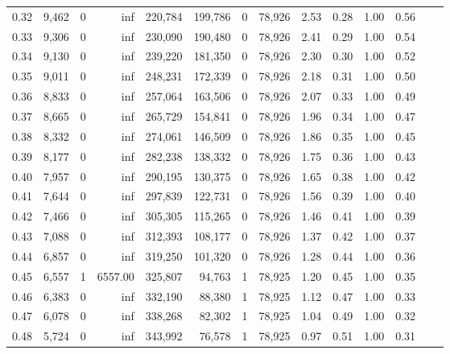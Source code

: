 \begin{tabular}{rrrrrrrrrrrrrr}
0.32 &  9,462 &      0 &      inf &  220,784 &  199,786 &       0 &  78,926 &  2.53 &  0.28 &  1.00 &      0.56 \\
0.33 &  9,306 &      0 &      inf &  230,090 &  190,480 &       0 &  78,926 &  2.41 &  0.29 &  1.00 &      0.54 \\
0.34 &  9,130 &      0 &      inf &  239,220 &  181,350 &       0 &  78,926 &  2.30 &  0.30 &  1.00 &      0.52 \\
0.35 &  9,011 &      0 &      inf &  248,231 &  172,339 &       0 &  78,926 &  2.18 &  0.31 &  1.00 &      0.50 \\
0.36 &  8,833 &      0 &      inf &  257,064 &  163,506 &       0 &  78,926 &  2.07 &  0.33 &  1.00 &      0.49 \\
0.37 &  8,665 &      0 &      inf &  265,729 &  154,841 &       0 &  78,926 &  1.96 &  0.34 &  1.00 &      0.47 \\
0.38 &  8,332 &      0 &      inf &  274,061 &  146,509 &       0 &  78,926 &  1.86 &  0.35 &  1.00 &      0.45 \\
0.39 &  8,177 &      0 &      inf &  282,238 &  138,332 &       0 &  78,926 &  1.75 &  0.36 &  1.00 &      0.43 \\
0.40 &  7,957 &      0 &      inf &  290,195 &  130,375 &       0 &  78,926 &  1.65 &  0.38 &  1.00 &      0.42 \\
0.41 &  7,644 &      0 &      inf &  297,839 &  122,731 &       0 &  78,926 &  1.56 &  0.39 &  1.00 &      0.40 \\
0.42 &  7,466 &      0 &      inf &  305,305 &  115,265 &       0 &  78,926 &  1.46 &  0.41 &  1.00 &      0.39 \\
0.43 &  7,088 &      0 &      inf &  312,393 &  108,177 &       0 &  78,926 &  1.37 &  0.42 &  1.00 &      0.37 \\
0.44 &  6,857 &      0 &      inf &  319,250 &  101,320 &       0 &  78,926 &  1.28 &  0.44 &  1.00 &      0.36 \\
0.45 &  6,557 &      1 &  6557.00 &  325,807 &   94,763 &       1 &  78,925 &  1.20 &  0.45 &  1.00 &      0.35 \\
0.46 &  6,383 &      0 &      inf &  332,190 &   88,380 &       1 &  78,925 &  1.12 &  0.47 &  1.00 &      0.33 \\
0.47 &  6,078 &      0 &      inf &  338,268 &   82,302 &       1 &  78,925 &  1.04 &  0.49 &  1.00 &      0.32 \\
0.48 &  5,724 &      0 &      inf &  343,992 &   76,578 &       1 &  78,925 &  0.97 &  0.51 &  1.00 &      0.31 \\

\end{tabular}
